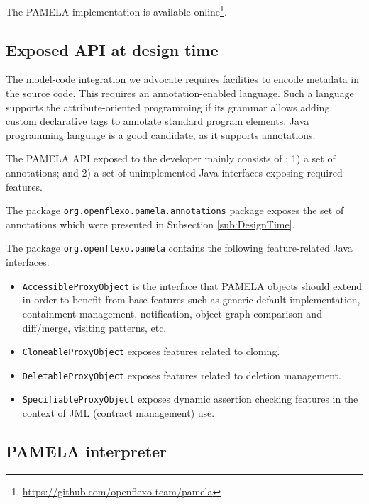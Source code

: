 The PAMELA implementation is available online\footnote {\url{https://github.com/openflexo-team/pamela}}.

\subsection{Exposed API at design time}

The model-code integration we advocate requires facilities to encode metadata in the source code. This requires an annotation-enabled language. Such a language supports the attribute-oriented programming if its grammar allows adding custom declarative tags to annotate standard program elements. Java programming language is a good candidate, as it supports annotations.

The PAMELA API exposed to the developer mainly consists of : 1) a set of annotations; and 2) a set of unimplemented Java interfaces exposing required features.

The package \texttt{org.openflexo.pamela.annotations} package exposes the set of annotations which were presented in Subsection \ref{sub:DesignTime}.

The package \texttt{org.openflexo.pamela} contains the following feature-related Java interfaces:
\begin{itemize}
    \item \texttt{AccessibleProxyObject} is the interface that PAMELA objects should extend in order to benefit from base features such as generic default implementation, containment management, notification, object graph comparison and diff/merge, visiting patterns, etc.
    \item \texttt{CloneableProxyObject} exposes features related to cloning.
    \item \texttt{DeletableProxyObject} exposes features related to deletion management.
    \item \texttt{SpecifiableProxyObject} exposes dynamic assertion checking features in the context of JML (contract management) use. 
\end{itemize}


\subsection{PAMELA interpreter}


